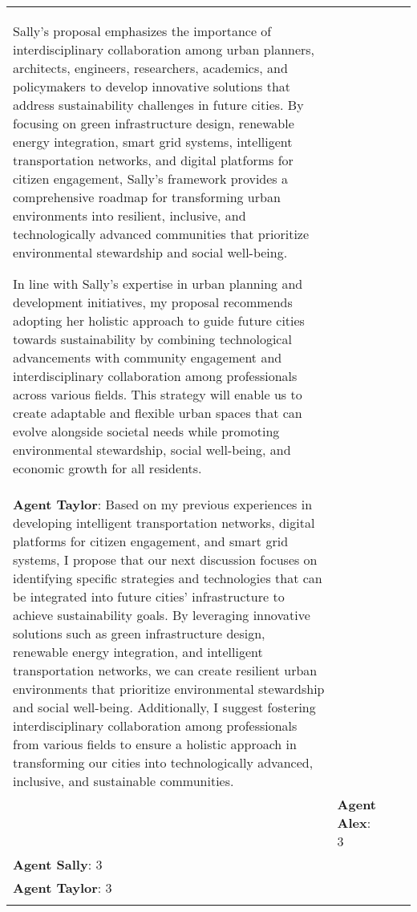 \documentclass{article}
\begin{document}
\begin{appendix}
\begin{tabular}{| m{2cm} | m{3cm} | m{5cm} | m{5cm} |}
Sally's proposal emphasizes the importance of interdisciplinary collaboration among urban planners, architects, engineers, researchers, academics, and policymakers to develop innovative solutions that address sustainability challenges in future cities. By focusing on green infrastructure design, renewable energy integration, smart grid systems, intelligent transportation networks, and digital platforms for citizen engagement, Sally's framework provides a comprehensive roadmap for transforming urban environments into resilient, inclusive, and technologically advanced communities that prioritize environmental stewardship and social well-being.

In line with Sally's expertise in urban planning and development initiatives, my proposal recommends adopting her holistic approach to guide future cities towards sustainability by combining technological advancements with community engagement and interdisciplinary collaboration among professionals across various fields. This strategy will enable us to create adaptable and flexible urban spaces that can evolve alongside societal needs while promoting environmental stewardship, social well-being, and economic growth for all residents. \\ 
\textbf{Agent Taylor}: Based on my previous experiences in developing intelligent transportation networks, digital platforms for citizen engagement, and smart grid systems, I propose that our next discussion focuses on identifying specific strategies and technologies that can be integrated into future cities' infrastructure to achieve sustainability goals. By leveraging innovative solutions such as green infrastructure design, renewable energy integration, and intelligent transportation networks, we can create resilient urban environments that prioritize environmental stewardship and social well-being. Additionally, I suggest fostering interdisciplinary collaboration among professionals from various fields to ensure a holistic approach in transforming our cities into technologically advanced, inclusive, and sustainable communities. \\ 
 & \textbf{Agent Alex}: 3 \\ 
\textbf{Agent Sally}: 3 \\ 
\textbf{Agent Taylor}: 3 \\ 
 \\
\hline

\end{tabular}
\end{appendix}
\end{document}
